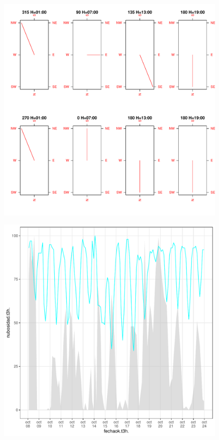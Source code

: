 \documentclass{article}\usepackage[]{graphicx}\usepackage[]{color}
\makeatletter
\def\maxwidth{ %
  \ifdim\Gin@nat@width>\linewidth
    \linewidth
  \else
    \Gin@nat@width
  \fi
}
\newenvironment{knitrout}{}{} %
\makeatother
\begin{document}
\begin{figure}[h!]
\begin{knitrout}
\color{fgcolor}
\includegraphics[width=\maxwidth]{figure/Figdir-1} 

\end{knitrout}
\end{figure}

\begin{figure}[h!]
\begin{knitrout}
\color{fgcolor}
\includegraphics[width=\maxwidth]{figure/Fig1-1} 

\end{knitrout}
\end{figure}
\end{document}

